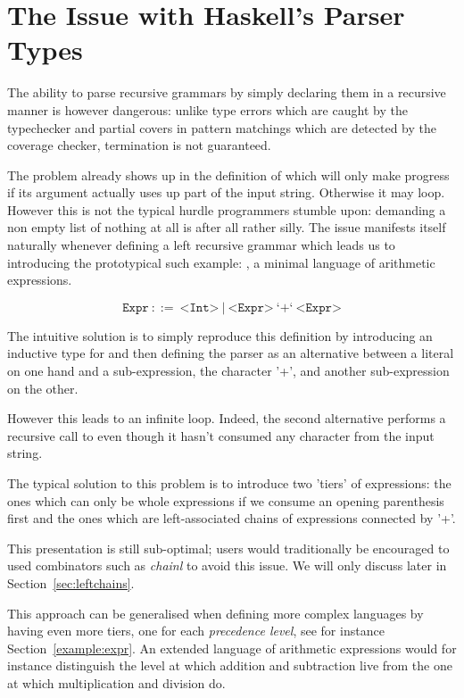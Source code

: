 \section{The Issue with Haskell's Parser Types}\label{sec:haskellproblem}

The ability to parse recursive grammars by simply declaring
them in a recursive manner is however dangerous: unlike type
errors which are caught by the typechecker and partial covers
in pattern matchings which are detected by the coverage checker,
termination is not guaranteed.

The problem already shows up in the definition of 
which will only make progress if its argument actually uses up
part of the input string. Otherwise it may loop. However this
is not the typical hurdle programmers stumble upon: demanding
a non empty list of nothing at all is after all rather silly.
The issue manifests itself naturally whenever defining a left
recursive grammar which leads us to introducing the prototypical
such example: , a minimal language of arithmetic
expressions.

\[
\texttt{Expr} ~::=~ \texttt{<Int>} ~|~ \texttt{<Expr>} ~\text{`+`}~ \texttt{<Expr>}
\]

The intuitive solution is to simply reproduce this definition by
introducing an inductive type for  and then defining
the parser as an alternative between a literal on one hand and a
sub-expression, the character '+', and another sub-expression on
the other.


However this leads to an infinite loop. Indeed, the second
alternative performs a recursive call to  even
though it hasn't consumed any character from the input string.

The typical solution to this problem is to introduce two 'tiers'
of expressions: the  ones which can only be whole
expressions if we consume an opening parenthesis first and the
 ones which are left-associated chains of 
expressions connected by '+'.\label{parser:expr}


This presentation is still sub-optimal; users would traditionally
be encouraged to used combinators such as \textit{chainl} to avoid
this issue. We will only discuss later in Section~\ref{sec:leftchains}.

This approach can be generalised when defining more complex
languages by having even more tiers, one for each
\emph{precedence level}, see for instance Section~\ref{example:expr}.
An extended language of arithmetic expressions would for
instance distinguish the level at which addition and
subtraction live from the one at which multiplication and
division do.

